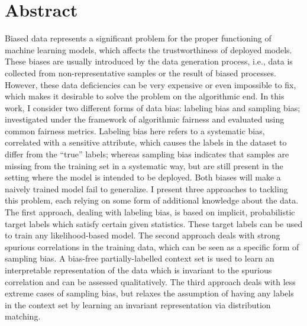 \begingroup
\let\clearpage\relax
\let\cleardoublepage\relax
\let\cleardoublepage\relax

\chapter*{Abstract}
Biased data represents a significant problem for the proper functioning of machine learning models,
which affects the trustworthiness of deployed models.
These biases are usually introduced by the data generation process,
i.e., data is collected from non-representative samples or the result of biased processes.
However, these data deficiencies can be very expensive or even impossible to fix,
which makes it desirable to solve the problem on the algorithmic end.
In this work, I consider two different forms of data bias:
labeling bias and sampling bias;
investigated under the framework of algorithmic fairness and evaluated using common fairness metrics.
Labeling bias here refers to a systematic bias,
correlated with a sensitive attribute,
which causes the labels in the dataset to differ from the ``true'' labels;
whereas sampling bias indicates that samples are missing from the training set in a systematic way,
but are still present in the setting where the model is intended to be deployed.
Both biases will make a naively trained model fail to generalize.
I present three approaches to tackling this problem, each relying on some form of additional knowledge about the data.
The first approach, dealing with labeling bias, is based on implicit, probabilistic target labels
which satisfy certain given statistics.
These target labels can be used to train any likelihood-based model.
The second approach deals with strong spurious correlations in the training data,
which can be seen as a specific form of sampling bias.
A bias-free partially-labelled context set is used to learn an interpretable representation of the data
which is invariant to the spurious correlation and can be assessed qualitatively.
The third approach deals with less extreme cases of sampling bias,
but relaxes the assumption of having any labels in the context set
by learning an invariant representation via distribution matching.

\endgroup

\vfill

